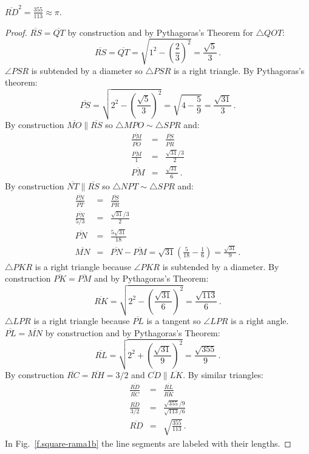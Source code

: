 \begin{theorem}
$\overline{RD}^2=\displaystyle\frac{355}{113}\approx \pi$.
\end{theorem}


\begin{proof}
$\overline{RS}=\overline{QT}$ by construction and by Pythagoras's Theorem for $\triangle QOT$:
\[
\overline{RS} =\overline{QT} =\sqrt{1^2-\left(\frac{2}{3}\right)^2}=\frac{\sqrt{5}}{3}\,.
\]
$\angle PSR$ is subtended by a diameter so $\triangle PSR$ is a right triangle. By Pythagoras's theorem:
\[
\overline{PS} = \sqrt{2^2-\left(\frac{\sqrt{5}}{3}\right)^2}=\sqrt{4-\frac{5}{9}}=\frac{\sqrt{31}}{3}\,.
\]
By construction $\overline{MO}\|\overline{RS}$ so
$\triangle MPO\sim \triangle SPR$ and:
%
\begin{eqnarray*}
\frac{\overline{PM}}{\overline{PO}}&=&\frac{\overline{PS}}{\overline{PR}}\\
\frac{\overline{PM}}{1}&=&\frac{\sqrt{31}/3}{2}\\
\overline{PM}&=&\frac{\sqrt{31}}{6}\,.
\end{eqnarray*}
By construction $\overline{NT}\|\overline{RS}$ so 
$\triangle NPT\sim \triangle SPR$ and:
\begin{eqnarray*}
\frac{\overline{PN}}{\overline{PT}}&=&\frac{\overline{PS}}{\overline{PR}}\\
\frac{\overline{PN}}{5/3}&=&\frac{\sqrt{31}/3}{2}\\
\overline{PN}&=&\frac{5\sqrt{31}}{18}\\
\overline{MN}&=&\overline{PN}-\overline{PM}=\sqrt{31}\left(\frac{5}{18}-\frac{1}{6}\right) = \frac{\sqrt{31}}{9}\,.
\end{eqnarray*}
$\triangle PKR$ is a right triangle because $\angle PKR$ is subtended by a diameter. By construction $\overline{PK}=\overline{PM}$ and by Pythagoras's Theorem:
\[
\overline{RK}=\sqrt{2^2-\left(\frac{\sqrt{31}}{6}\right)^2} = \frac{\sqrt{113}}{6}\,.
\]
$\triangle LPR$ is a right triangle because $\overline{PL}$ is a tangent so $\angle LPR$ is a right angle. $\overline{PL}=\overline{MN}$ by construction and by Pythagoras's Theorem:
\[
\overline{RL}=\sqrt{2^2+\left(\frac{\sqrt{31}}{9}\right)^2} = \frac{\sqrt{355}}{9}\,.
\]
By construction
$\overline{RC}=\overline{RH}=3/2$ and $\overline{CD} \|\overline{LK}$. By similar triangles:
%
\begin{eqnarray*}
\frac{\overline{RD}}{\overline{RC}}&=&\frac{\overline{RL}}{\overline{RK}}\\
\frac{\overline{RD}}{3/2}&=&\frac{\sqrt{355}/9}{\sqrt{113}/6}\\
\overline{RD}&=&\sqrt{\frac{355}{113}}\,.            
\end{eqnarray*}
In Fig.~\ref{f.square-rama1b} the line segments are labeled with their lengths.
\end{proof}

